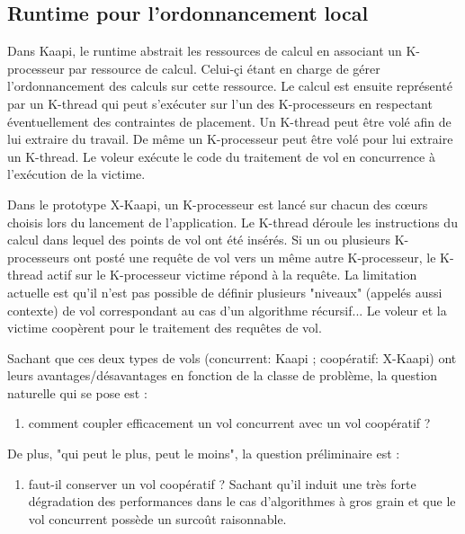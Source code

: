\documentclass[12pt]{report}
\begin{document}
\subsection{Runtime pour l'ordonnancement local}
Dans Kaapi, le runtime abstrait les ressources de calcul en associant un K-processeur par ressource de calcul. Celui-çi étant en charge de gérer l'ordonnancement des calculs sur cette ressource.  Le calcul est ensuite représenté par un K-thread qui peut s'exécuter sur l'un des K-processeurs en respectant éventuellement des contraintes de placement. Un K-thread peut être volé afin de lui extraire du travail. De même un K-processeur peut être volé pour lui extraire un K-thread. 
Le voleur exécute le code du traitement de vol en concurrence à l'exécution de la victime.

Dans le prototype X-Kaapi, un K-processeur est lancé sur chacun des cœurs choisis lors du lancement de l'application. Le K-thread déroule les instructions du calcul dans lequel des points de vol ont été insérés. Si un ou plusieurs K-processeurs ont posté une requête de vol vers un même autre K-processeur, le K-thread actif sur le K-processeur victime répond à la requête. La limitation actuelle est qu'il n'est pas possible de définir plusieurs "niveaux" (appelés aussi contexte) de vol correspondant au cas d'un algorithme récursif...
Le voleur et la victime coopèrent pour le traitement des requêtes de vol.

Sachant que ces deux types de vols (concurrent: Kaapi ; coopératif: X-Kaapi) ont leurs avantages/désavantages en fonction de la classe de problème, la question naturelle qui se pose est :
\begin{enumerate}[label=\textbf{Q \theenumi.},ref=\textbf{Q \theenumi},resume]
	\item comment coupler efficacement un vol concurrent avec un vol coopératif ?
\end{enumerate}

De plus, "qui peut le plus, peut le moins", la question préliminaire est :
\begin{enumerate}[label=\textbf{Q \theenumi.},ref=\textbf{Q \theenumi},resume]
	\item faut-il conserver un vol coopératif ? Sachant qu'il induit une très forte dégradation des performances dans le cas d'algorithmes à gros grain et que le vol concurrent possède un surcoût raisonnable.
\end{enumerate}
\end{document}
